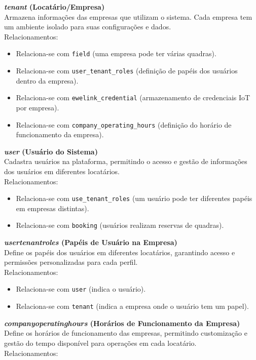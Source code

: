 \noindent\textbf{\textit{tenant} (Locatário/Empresa)}\\
Armazena informações das empresas que utilizam o sistema. Cada empresa tem um ambiente isolado para suas configurações e dados.\\
Relacionamentos:
\begin{itemize}
	\item Relaciona-se com \texttt{field} (uma empresa pode ter várias quadras).
	\item Relaciona-se com \texttt{user\_tenant\_roles} (definição de papéis dos usuários dentro da empresa).
	\item Relaciona-se com \texttt{ewelink\_credential} (armazenamento de credenciais IoT por empresa).
	\item Relaciona-se com \texttt{company\_operating\_hours} (definição do horário de funcionamento da empresa).
\end{itemize}

\noindent\textbf{\textit{user} (Usuário do Sistema)}\\
Cadastra usuários na plataforma, permitindo o acesso e gestão de informações dos usuários em diferentes locatários. \\
Relacionamentos: 
\begin{itemize} 
	\item Relaciona-se com \texttt{use\_tenant\_roles} (um usuário pode ter diferentes papéis em empresas distintas). 
	\item Relaciona-se com \texttt{booking} (usuários realizam reservas de quadras). 
\end{itemize}

\noindent\textbf{\textit{user\textunderscore tenant\textunderscore roles} (Papéis de Usuário na Empresa)}\\
Define os papéis dos usuários em diferentes locatários, garantindo acesso e permissões personalizadas para cada perfil. \\
Relacionamentos: 

\begin{itemize} 
	\item Relaciona-se com \texttt{user} (indica o usuário). 
	\item Relaciona-se com \texttt{tenant} (indica a empresa onde o usuário tem um papel). 
\end{itemize}


\noindent\textbf{\textit{company\textunderscore operating\textunderscore hours} (Horários de Funcionamento da Empresa)}\\
Define os horários de funcionamento das empresas, permitindo customização e gestão do tempo disponível para operações em cada locatário. \\
Relacionamentos: 


